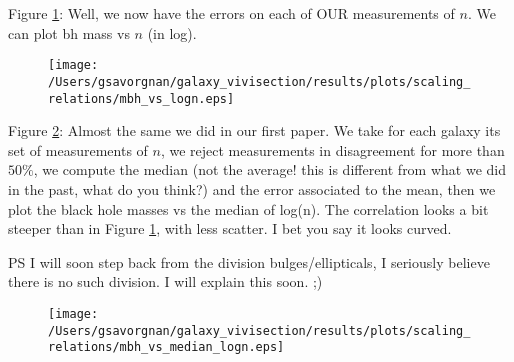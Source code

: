 \documentclass[preprint2]{aastex}
\begin{document}
Figure \ref{fig:mbhn}: Well, we now have the errors on each of OUR measurements of $n$.
We can plot bh mass vs $n$ (in log). 

\begin{figure}
\texttt{[image: /Users/gsavorgnan/galaxy\_vivisection/results/plots/scaling\_relations/mbh\_vs\_logn.eps]}
\caption{}
\label{fig:mbhn}
\end{figure}

Figure \ref{fig:mbhavn}: Almost the same we did in our first paper. We take for each galaxy its set of measurements of $n$,
we reject measurements in disagreement for more than $50\%$,
we compute the median (not the average! this is different from what we did in the past, what do you think?) 
and the error associated to the mean, then we plot the black hole masses vs the median of log(n).
The correlation looks a bit steeper than in Figure \ref{fig:mbhn}, 
with less scatter. I bet you say it looks curved. 

PS I will soon step back from the division bulges/ellipticals, 
I seriously believe there is no such division. 
I will explain this soon. ;)

\begin{figure}
\texttt{[image: /Users/gsavorgnan/galaxy\_vivisection/results/plots/scaling\_relations/mbh\_vs\_median\_logn.eps]}
\caption{}
\label{fig:mbhavn}
\end{figure}









\end{document}
